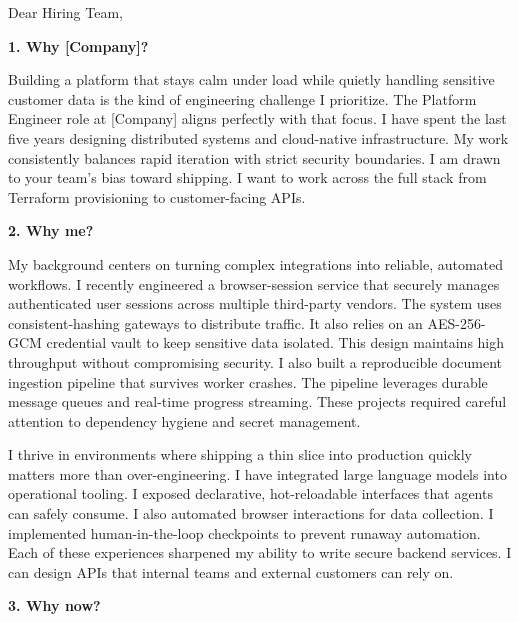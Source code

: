 \documentclass[11pt,a4paper]{coverletter}
\begin{document}

\opening{Dear Hiring Team,}

\vspace{8pt}\noindent\textbf{1. Why [Company]?}\par\vspace{3pt}

Building a platform that stays calm under load while quietly handling sensitive customer data is the kind of engineering challenge I prioritize. The Platform Engineer role at [Company] aligns perfectly with that focus. I have spent the last five years designing distributed systems and cloud-native infrastructure. My work consistently balances rapid iteration with strict security boundaries. I am drawn to your team’s bias toward shipping. I want to work across the full stack from Terraform provisioning to customer-facing APIs.

\vspace{8pt}\noindent\textbf{2. Why me?}\par\vspace{3pt}

My background centers on turning complex integrations into reliable, automated workflows. I recently engineered a browser-session service that securely manages authenticated user sessions across multiple third-party vendors. The system uses consistent-hashing gateways to distribute traffic. It also relies on an AES-256-GCM credential vault to keep sensitive data isolated. This design maintains high throughput without compromising security. I also built a reproducible document ingestion pipeline that survives worker crashes. The pipeline leverages durable message queues and real-time progress streaming. These projects required careful attention to dependency hygiene and secret management.

I thrive in environments where shipping a thin slice into production quickly matters more than over-engineering. I have integrated large language models into operational tooling. I exposed declarative, hot-reloadable interfaces that agents can safely consume. I also automated browser interactions for data collection. I implemented human-in-the-loop checkpoints to prevent runaway automation. Each of these experiences sharpened my ability to write secure backend services. I can design APIs that internal teams and external customers can rely on.

\vspace{8pt}\noindent\textbf{3. Why now?}\par\vspace{3pt}
\end{document}
